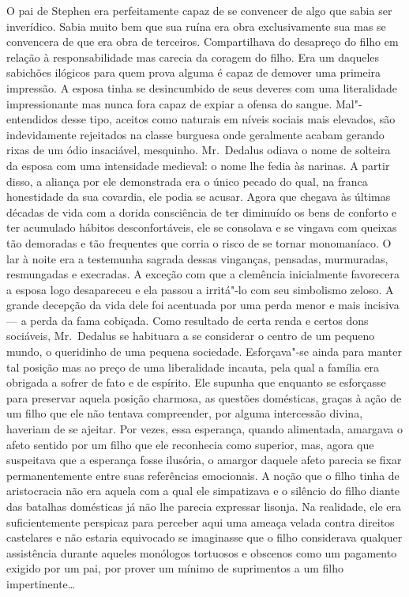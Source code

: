 O pai de Stephen era perfeitamente capaz de se convencer de algo que sabia ser
inverídico.  Sabia muito bem que sua ruína era obra exclusivamente sua mas se
convencera de que era obra de terceiros.  Compartilhava do desapreço do filho
em relação à responsabilidade mas carecia da coragem do filho.  Era um daqueles
sabichões ilógicos para quem prova alguma é capaz de demover uma primeira
impressão.  A esposa tinha se desincumbido de seus deveres com uma literalidade
impressionante mas nunca fora capaz de expiar a ofensa do sangue.
Mal"-entendidos desse tipo, aceitos como naturais em níveis sociais mais
elevados, são indevidamente rejeitados na classe burguesa onde geralmente
acabam gerando rixas de um ódio insaciável, mesquinho.  Mr.~Dedalus odiava o
nome de solteira da esposa com uma intensidade medieval: o nome lhe fedia às
narinas.  A partir disso, a aliança por ele demonstrada era o único pecado do
qual, na franca honestidade da sua covardia, ele podia se acusar.  Agora que
chegava às últimas décadas de vida com a dorida consciência de ter diminuído os
bens de conforto e ter acumulado hábitos desconfortáveis, ele se consolava e se
vingava com queixas tão demoradas e tão frequentes que corria o risco de se
tornar monomaníaco.  O lar à noite era a testemunha sagrada dessas vinganças,
pensadas, murmuradas, resmungadas e execradas.  A exceção com que a clemência
inicialmente favorecera a esposa logo desapareceu e ela passou a irritá"-lo com
seu simbolismo zeloso.  A grande decepção da vida dele foi acentuada por uma
perda menor e mais incisiva --- a perda da fama cobiçada.  Como resultado de
certa renda e certos dons sociáveis, Mr.~Dedalus se habituara a se considerar
o centro de um pequeno mundo, o queridinho de uma pequena sociedade.
Esforçava"-se ainda para manter tal posição mas ao preço de uma liberalidade
incauta, pela qual a família era obrigada a sofrer de fato e de espírito.  Ele
supunha que enquanto se esforçasse para preservar aquela posição charmosa, as
questões domésticas, graças à ação de um filho que ele não tentava compreender,
por alguma intercessão divina, haveriam de se ajeitar.  Por vezes, essa
esperança, quando alimentada, amargava o afeto sentido por um filho que ele
reconhecia como superior, mas, agora que suspeitava que a esperança fosse
ilusória, o amargor daquele afeto parecia se fixar permanentemente entre suas
referências emocionais.  A noção que o filho tinha de aristocracia não era
aquela com a qual ele simpatizava e o silêncio do filho diante das batalhas
domésticas já não lhe parecia expressar lisonja.  Na realidade, ele era
suficientemente perspicaz para perceber aqui uma ameaça velada contra direitos
castelares e não estaria equivocado se imaginasse que o filho considerava
qualquer assistência durante aqueles monólogos tortuosos e obscenos como um
pagamento exigido por um pai, por prover um mínimo de suprimentos a um filho
impertinente\ldots{}

